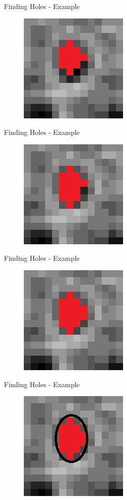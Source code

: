 \documentclass{beamer}
\begin{document}
\begin{frame}{Finding Holes - Example}
	\begin{figure}
		\includegraphics[height=150pt]{images/image46.jpg}
	\end{figure}
\end{frame}
\begin{frame}{Finding Holes - Example}
	\begin{figure}
		\includegraphics[height=150pt]{images/image47.jpg}
	\end{figure}
\end{frame}
\begin{frame}{Finding Holes - Example}
	\begin{figure}
		\includegraphics[height=150pt]{images/image48.jpg}
	\end{figure}
\end{frame}
\begin{frame}{Finding Holes - Example}
	\begin{figure}
		\includegraphics[height=150pt]{images/image49.jpg}
	\end{figure}
\end{frame}
\end{document}
